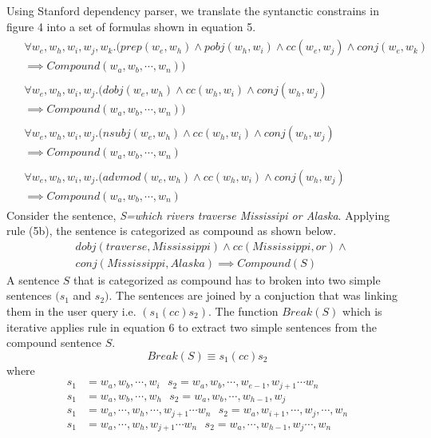 \documentclass[review]{elsarticle}
\begin{document}
Using Stanford dependency parser, we translate the syntanctic constrains in figure 4 into a set of formulas shown in equation 5.
\begin{subequations}
\begin{align}
\begin{split}
&\forall w_e,w_h,w_i,w_j,w_k.(prep(w_e,w_h)\land pobj(w_h,w_i)\land cc(w_e,w_j)\land conj(w_e,w_k)\\
&\implies Compound(w_a,w_b,\cdots,w_n))
\end{split}\\
\begin{split}
&\forall   w_e,w_h,w_i,w_j.(dobj(w_e,w_h)\land cc(w_h,w_i)\land conj(w_h,w_j)\\
&\implies Compound(w_a,w_b,\cdots,w_n))
\end{split}\\
\begin{split}
&\forall  w_e,w_h,w_i,w_j.(nsubj(w_e,w_h)\land cc(w_h,w_i)\land conj(w_h,w_j)\\
&\implies Compound(w_a,w_b,\cdots,w_n)
\end{split}\\
\begin{split}
&\forall  w_e,w_h,w_i,w_j.(advmod(w_e,w_h)\land cc(w_h,w_i)\land conj(w_h,w_j)\\
&\implies Compound(w_a,w_b,\cdots,w_n)
\end{split}
\end{align}
\end{subequations}
Consider the sentence, \textit{S=which rivers traverse Mississipi or  Alaska}.  Applying  rule (5b),  the sentence is categorized as compound as shown below.
\begin{equation*}
\begin{split}
&dobj(traverse,Mississippi)\land cc(Mississippi,or)\land\\
&conj(Mississippi, Alaska)\implies Compound(S)
\end{split}
\end{equation*}
A sentence $S$ that is categorized as compound has to broken into two simple sentences $(s_1$ and $s_2)$. The sentences are  joined by a conjuction that was linking them in the user query i.e. $(s_1(cc)s_2)$. 
The function $Break(S)$ which is iterative applies  rule in equation 6 to extract two simple sentences from the compound sentence $S$.
\begin{equation}
Break(S)\equiv s_1 (cc) s_2
\end{equation}
where
\begin{subequations}
\begin{align}
s_1&=w_a,w_b,\cdots,w_i  \text{         } s_2=w_a,w_b,\cdots,w_{e-1},w_{j+1}\cdots w_n\\
s_1&=w_a,w_b,\cdots,w_h  \text{         }s_2=w_a,w_b,\cdots,w_{h-1},w_j\\
s_1&=w_a,\cdots,w_h,\cdots,w_{j+1}\cdots w_n \text{         } s_2=w_a,w_{i+1},\cdots,w_j,\cdots,w_n\\
s_1&=w_a,\cdots,w_h,w_{j+1}\cdots w_n \text{         } s_2=w_a,\cdots,w_{h-1}, w_j\cdots,w_n
\end{align}
\end{subequations}
\end{document}
